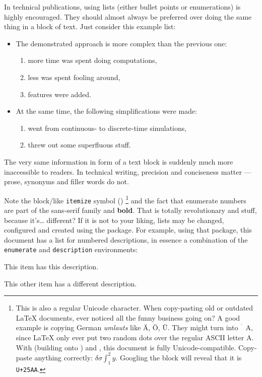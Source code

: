 In technical publications, using lists (either bullet points or enumerations)
is highly encouraged.
They should almost always be preferred over doing the same thing in a block of text.
Just consider this example list:
\begin{itemize}
    \item The demonstrated approach is more complex than the previous one:
          \begin{enumerate}
              \item more time was spent doing computations,
              \item less was spent fooling around,
              \item features were added.
          \end{enumerate}
    \item At the same time, the following simplifications were made:
          \begin{enumerate}
              \item went from continuous- to discrete-time simulations,
              \item threw out some superfluous stuff.
          \end{enumerate}
\end{itemize}
The very same information in form of a text block is suddenly much more inaccessible
to readers.
In technical writing, precision and conciseness matter --- prose, synonyms and
filler words do not.

Note the block\-/like \texttt{itemize} symbol (\smblksquare{})%
\footnote{%
    This is also a regular Unicode character.
    When copy-pasting old or outdated \LaTeX{} documents, ever noticed all the
    funny business going on?
    A good example is copying German \emph{umlauts} like Ä, Ö, Ü.
    They might turn into \emph{\(\ddot{\phantom{A}}\text{A}\)}, since \LaTeX{}
    only ever put two random dots over the regular ASCII letter A.
    With  (building onto ) and
    , this document is fully Unicode-compatible.
    Copy-paste anything correctly: \(\delta \sigma \int_{1}^{2} y\).
    Googling the \smblksquare{} block will reveal that it is \texttt{U+25AA}.
}
and the fact that enumerate numbers are part of the {\sffamily sans-serif family}
and \textbf{bold}.
That is totally revolutionary and stuff, because it's\dots{} different?
If it is not to your liking, lists may be changed, configured and created using the
 package.
For example, using that package, this document has a list for numbered descriptions,
in essence a combination of the \verb|enumerate| and \verb|description| environments:
\begin{enumdescript}
    \item[This item] has this description.
    \item[This other item] has a different description.
\end{enumdescript}

